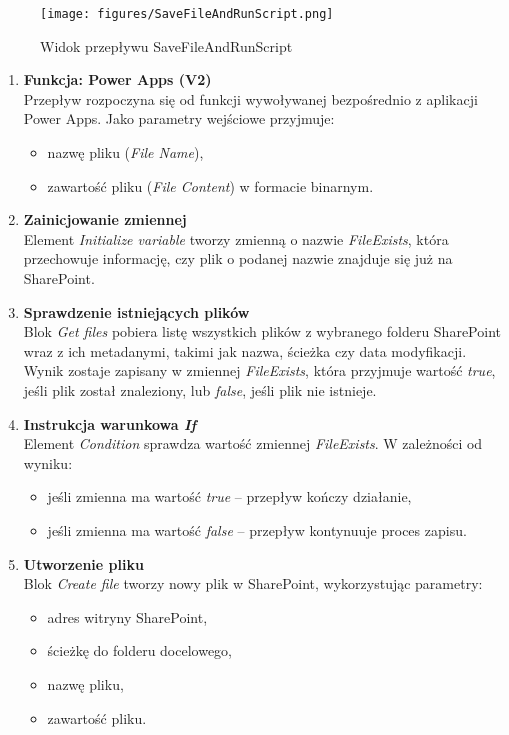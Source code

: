 \begin{figure}[t]
    \centering
    \texttt{[image: figures/SaveFileAndRunScript.png]}
    \caption{Widok przepływu SaveFileAndRunScript}
    \label{fig:savefileandrunscript}
\end{figure}


\begin{enumerate}
    \item \textbf{Funkcja: Power Apps (V2)} \\
    Przepływ rozpoczyna się od funkcji wywoływanej bezpośrednio z aplikacji Power Apps. Jako parametry wejściowe przyjmuje:
    \begin{itemize}
        \item nazwę pliku (\textit{File Name}),
        \item zawartość pliku (\textit{File Content}) w formacie binarnym.
    \end{itemize}

    \item \textbf{Zainicjowanie zmiennej} \\
    Element \textit{Initialize variable} tworzy zmienną o nazwie \textit{FileExists}, która przechowuje informację, czy plik o podanej nazwie znajduje się już na SharePoint.

    \item \textbf{Sprawdzenie istniejących plików} \\
    Blok \textit{Get files} pobiera listę wszystkich plików z wybranego folderu SharePoint wraz z ich metadanymi, takimi jak nazwa, ścieżka czy data modyfikacji. Wynik zostaje zapisany w zmiennej \textit{FileExists}, która przyjmuje wartość \textit{true}, jeśli plik został znaleziony, lub \textit{false}, jeśli plik nie istnieje.

    \item \textbf{Instrukcja warunkowa \emph{If}} \\
    Element \textit{Condition} sprawdza wartość zmiennej \textit{FileExists}. W zależności od wyniku:
    \begin{itemize}
        \item jeśli zmienna ma wartość \textit{true} -- przepływ kończy działanie,
        \item jeśli zmienna ma wartość \textit{false} -- przepływ kontynuuje proces zapisu.
    \end{itemize}

    \item \textbf{Utworzenie pliku} \\
    Blok \textit{Create file} tworzy nowy plik w SharePoint, wykorzystując parametry:
    \begin{itemize}
        \item adres witryny SharePoint,
        \item ścieżkę do folderu docelowego,
        \item nazwę pliku,
        \item zawartość pliku.
    \end{itemize}


\end{enumerate}
